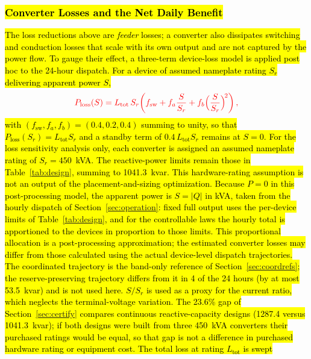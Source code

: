 \documentclass{ieeeaccess}
\newcommand{\rev}[1]{{\color{red}\hl{#1}}}
\newcommand{\reveq}[1]{{\color{red}#1}}
\newcommand{\rev}[1]{#1}
\newcommand{\reveq}[1]{#1}
\begin{document}
\subsubsection{\rev{Converter Losses and the Net Daily Benefit}}
\rev{The loss reductions above are \emph{feeder} losses; a converter also dissipates
switching and conduction losses that scale with its own output and are not captured
by the power flow. To gauge their effect, a three-term device-loss model is applied post hoc to the
24-hour dispatch. For a device of assumed nameplate rating $S_r$ delivering apparent power $S$,}
\begin{equation}
\reveq{P_{\mathrm{loss}}(S)=L_{\mathrm{tot}}\,S_r\!\left(f_{\mathrm{sw}}
+f_a\frac{S}{S_r}+f_b\Big(\frac{S}{S_r}\Big)^{\!2}\right),}
\label{eq:vscloss}
\end{equation}
\rev{with $(f_{\mathrm{sw}},f_a,f_b)=(0.4,0.2,0.4)$ summing to unity, so that
$P_{\mathrm{loss}}(S_r)=L_{\mathrm{tot}}S_r$ and a standby term of
$0.4\,L_{\mathrm{tot}}S_r$ remains at $S=0$. For the loss sensitivity analysis only, each
converter is assigned an assumed nameplate rating of \mbox{$S_r=450$ kVA}. The
reactive-power limits remain those in Table~\mbox{\ref{tab:design}}, summing to
\mbox{1041.3 kvar}. This hardware-rating assumption is not an output of the
placement-and-sizing optimization. Because \mbox{$P=0$} in this post-processing model, the
apparent power is \mbox{$S=|Q|$} in kVA, taken from the hourly dispatch of
Section~\mbox{\ref{sec:operation}}: fixed full output uses the per-device limits of
Table~\mbox{\ref{tab:design}}, and for the controllable laws the hourly total is
apportioned to the devices in proportion to those limits. This proportional allocation is a
post-processing approximation; the estimated converter losses may differ from those
calculated using the actual device-level dispatch trajectories. The coordinated trajectory is
the band-only reference of Section~\mbox{\ref{sec:coordrefs}}; the reserve-preserving
trajectory differs from it in 4 of the 24 hours (by at most \mbox{53.5 kvar}) and is not
used here. \mbox{$S/S_r$} is used as a proxy for the current ratio, which neglects the
terminal-voltage variation. The \mbox{23.6\%} gap of Section~\mbox{\ref{sec:certify}}
compares continuous reactive-capacity designs (\mbox{1287.4} versus \mbox{1041.3 kvar});
if both designs were built from three \mbox{450 kVA} converters their purchased ratings
would be equal, so that gap is not a difference in purchased hardware rating or equipment
cost. The total loss at rating $L_{\mathrm{tot}}$ is swept
}
\end{document}
